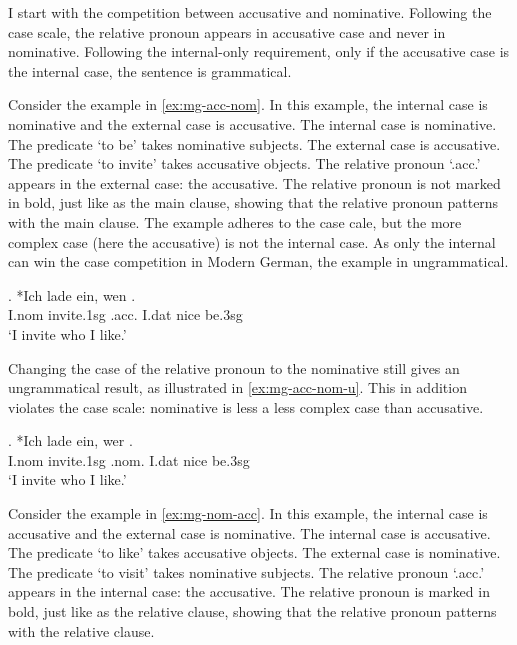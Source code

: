 I start with the competition between accusative and nominative. Following the case scale, the relative pronoun appears in accusative case and never in nominative. Following the internal-only requirement, only if the accusative case is the internal case, the sentence is grammatical.

Consider the example in \ref{ex:mg-acc-nom}. In this example, the internal case is nominative and the external case is accusative.
The internal case is nominative. The predicate  `to be' takes nominative subjects.
The external case is accusative. The predicate  `to invite' takes accusative objects.
The relative pronoun  `.\ac{acc}.' appears in the external case: the accusative. The relative pronoun is not marked in bold, just like as the main clause, showing that the relative pronoun patterns with the main clause.
The example adheres to the case cale, but the more complex case (here the accusative) is not the internal case. As only the internal can win the case competition in Modern German, the example in ungrammatical.

\exg. *Ich {lade ein}, wen   .\\
I.\ac{nom} invite.1\ac{sg}\scsub{[acc]} .\ac{acc}. I.\ac{dat} nice be.3\ac{sg}\scsub{[nom]}\\
`I invite who I like.' \label{ex:mg-acc-nom}

Changing the case of the relative pronoun to the nominative still gives an ungrammatical result, as illustrated in \ref{ex:mg-acc-nom-u}. This in addition violates the case scale: nominative is less a less complex case than accusative.

\exg. *Ich {lade ein}, wer   .\\
I.\ac{nom} invite.1\ac{sg}\scsub{[acc]} .\ac{nom}. I.\ac{dat} nice be.3\ac{sg}\scsub{[nom]}\\
`I invite who I like.' \label{ex:mg-acc-nom-u}

Consider the example in \ref{ex:mg-nom-acc}. In this example, the internal case is accusative and the external case is nominative.
The internal case is accusative. The predicate  `to like' takes accusative objects.
The external case is nominative. The predicate  `to visit' takes nominative subjects.
The relative pronoun  `.\ac{acc}.' appears in the internal case: the accusative. The relative pronoun is marked in bold, just like as the relative clause, showing that the relative pronoun patterns with the relative clause.

